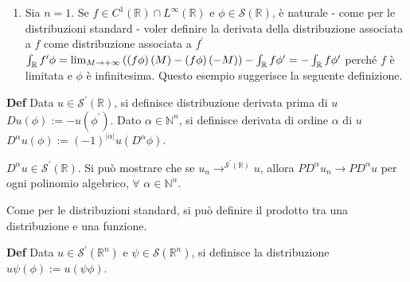 \documentclass{article}
\begin{document}
\begin{enumerate}
\item Sia $n=1$. Se $f\in C^{1}\left( 
\mathbb{R}
\right) \cap L^{\infty }\left( 
\mathbb{R}
\right) $ e $\phi \in \mathcal{S}\left( 
\mathbb{R}
\right) $, \`{e} naturale - come per le distribuzioni standard - voler
definire la derivata della distribuzione associata a $f$ come distribuzione
associata a $f^{\prime }$ $\int_{%
\mathbb{R}
}f^{\prime }\phi =\lim_{M\rightarrow +\infty }\left( \left( f\phi \right)
\left( M\right) -\left( f\phi \right) \left( -M\right) \right) -\int_{%
\mathbb{R}
}f\phi ^{\prime }=-\int_{%
\mathbb{R}
}f\phi ^{\prime }$ perch\'{e} $f$ \`{e} limitata e $\phi $ \`{e}
infinitesima. Questo esempio suggerisce la seguente definizione.
\end{enumerate}

\textbf{Def} Data $u\in \mathcal{S}^{\prime }\left( 
\mathbb{R}
\right) $, si definisce distribuzione derivata prima di $u$ $Du\left( \phi
\right) :=-u\left( \phi ^{\prime }\right) $. Dato $\alpha \in 
\mathbb{N}
^{n}$, si definisce derivata di ordine $\alpha $ di $u$ $D^{\alpha }u\left(
\phi \right) :=\left( -1\right) ^{\left\vert \alpha \right\vert }u\left(
D^{\alpha }\phi \right) $.

$D^{\alpha }u\in \mathcal{S}^{\prime }\left( 
\mathbb{R}
\right) $. Si pu\`{o} mostrare che se $u_{n}\rightarrow ^{\mathcal{S}%
^{\prime }\left( 
\mathbb{R}
\right) }u$, allora $PD^{\alpha }u_{n}\rightarrow PD^{\alpha }u$ per ogni
polinomio algebrico, $\forall $ $\alpha \in 
\mathbb{N}
^{n}$.

Come per le distribuzioni standard, si pu\`{o} definire il prodotto tra una
distribuzione e una funzione.

\textbf{Def} Data $u\in \mathcal{S}^{\prime }\left( 
\mathbb{R}
^{n}\right) $ e $\psi \in \mathcal{S}\left( 
\mathbb{R}
^{n}\right) $, si definisce la distribuzione $u\psi \left( \phi \right)
:=u\left( \psi \phi \right) $.
\end{document}
